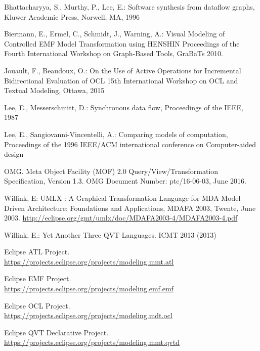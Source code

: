 \documentclass[conference]{IEEEtran}
\begin{document}
%
%
%
\begin{thebibliography}{1}

Bhattacharyya, S., Murthy, P., Lee, E.: Software synthesis from dataflow graphs, Kluwer Academic Press, Norwell, MA, 1996

Biermann, E., Ermel, C., Schmidt, J., Warning, A.:
Visual Modeling of Controlled EMF Model Transformation using HENSHIN
Proceedings of the Fourth International Workshop on Graph-Based Tools, GraBaTs 2010.

Jouault, F., Beaudoux, O.:
On the Use of Active Operations for Incremental Bidirectional Evaluation of OCL
15th International Workshop on OCL and Textual Modeling, Ottawa, 2015

Lee, E., Messerschmitt, D.: Synchronous data flow, Proceedings of the IEEE, 1987

Lee, E., Sangiovanni-Vincentelli, A.: Comparing models of computation, Proceedings of the 1996 IEEE/ACM international conference on Computer-aided design

OMG. Meta Object Facility (MOF) 2.0 Query/View/Transformation Specification, Version 1.3.
OMG Document Number: ptc/16-06-03, June 2016.

Willink, E: UMLX : A Graphical Transformation Language for MDA
Model Driven Architecture: Foundations and Applications, MDAFA 2003, Twente, June 2003.
\url{http://eclipse.org/gmt/umlx/doc/MDAFA2003-4/MDAFA2003-4.pdf}

Willink, E.:
Yet Another Three QVT Languages.
ICMT 2013 (2013)

Eclipse ATL Project.\\
\url{https://projects.eclipse.org/projects/modeling.mmt.atl}

Eclipse EMF Project.\\
\url{https://projects.eclipse.org/projects/modeling.emf.emf}

Eclipse OCL Project.\\
\url{https://projects.eclipse.org/projects/modeling.mdt.ocl}

Eclipse QVT Declarative Project.\\
\url{https://projects.eclipse.org/projects/modeling.mmt.qvtd}
\end{thebibliography}




\end{document}
